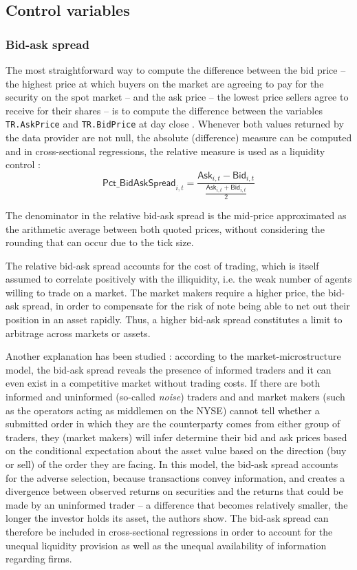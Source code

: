 \subsection{Control variables}
\subsubsection{Bid-ask spread}
The most straightforward way to compute the difference between the bid price -- the highest price at which buyers on the market are agreeing to pay for the security on the spot market -- and the ask price -- the lowest price sellers agree to receive for their shares -- is to compute the difference between the variables \texttt{TR.AskPrice} and \texttt{TR.BidPrice} at day close . Whenever both values returned by the data provider are not null, the absolute (difference) measure can be computed and in cross-sectional regressions, the relative measure is used as a liquidity control :
\begin{equation}
  \mathsf{Pct\_BidAskSpread}_{i, t} = \frac{\mathsf{Ask}_{i, t} - \mathsf{Bid}_{i, t}}{\frac{\mathsf{Ask}_{i, t} + \mathsf{Bid}_{i, t}}{2}}
\end{equation}

The denominator in the relative bid-ask spread is the mid-price approximated as the arithmetic average between both quoted prices, without considering the rounding that can occur due to the tick size.

The relative bid-ask spread accounts for the cost of trading, which is itself assumed to correlate positively with the illiquidity, i.e. the weak number of agents willing to trade on a market. The market makers require a higher price, the bid-ask spread, in order to compensate for the risk of note being able to net out their position in an asset rapidly. Thus, a higher bid-ask spread constitutes a limit to arbitrage across markets or assets.

Another explanation has been studied : according to the \textcite{Glosten1985} market-microstructure model, the bid-ask spread reveals the presence of informed traders and it can even exist in a competitive market without trading costs. If there are both informed and uninformed (so-called \emph{noise}) traders and and market makers (such as the operators acting as middlemen on the NYSE) cannot tell whether a submitted order in which they are the counterparty comes from either group of traders, they (market makers) will infer determine their bid and ask prices based on the conditional expectation about the asset value based on the direction (buy or sell) of the order they are facing. In this model, the bid-ask spread accounts for the adverse selection, because transactions convey information, and creates a divergence between observed returns on securities and the returns that could be made by an uninformed trader -- a difference that becomes relatively smaller, the longer the investor holds its asset, the authors show. The bid-ask spread can therefore be included in cross-sectional regressions in order to account for the unequal liquidity provision as well as the unequal availability of information regarding firms.
